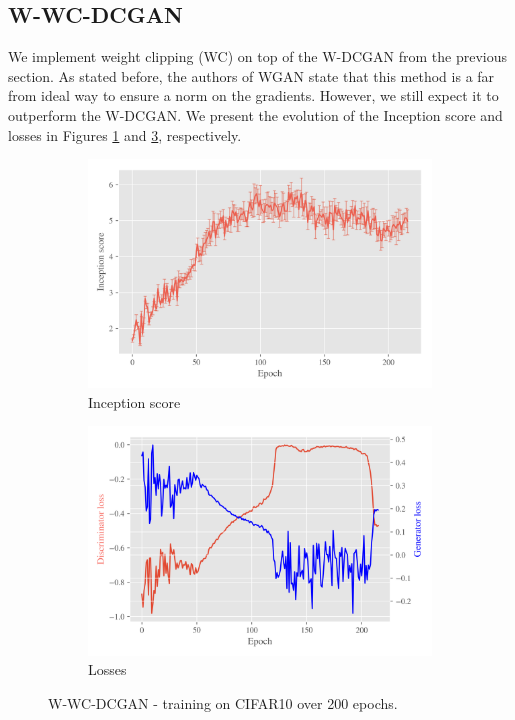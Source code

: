 \subsection{W-WC-DCGAN}
\label{sec:exp-w-wc-dcgan}
We implement weight clipping (WC) on top of the W-DCGAN from the previous section. As stated before, the authors of WGAN state that this method is a far from ideal way to ensure a norm on the gradients. However, we still expect it to outperform the W-DCGAN. We present the evolution of the Inception score and losses in Figures \ref{fig:exp-w-wc-dcgan-is} and \ref{fig:exp-w-wc-dcgan-losses}, respectively. %
\begin{figure}[H]
    \centering
    \begin{subfigure}[t]{0.49\textwidth}
        \centering
		\includegraphics[width=\textwidth]{../code/results/figures/w-wc-dcgan_cifar10_is.png}
		\caption{Inception score}
		\label{fig:exp-w-wc-dcgan-is}
    \end{subfigure}
    \begin{subfigure}[t]{0.49\textwidth}
        \centering
        \includegraphics[width=\textwidth]{../code/results/figures/w-wc-dcgan_cifar10_losses.png}
		\caption{Losses}
		\label{fig:exp-w-wc-dcgan-losses}
    \end{subfigure}
    \caption{W-WC-DCGAN - training on CIFAR10 over 200 epochs.}
\end{figure}%
